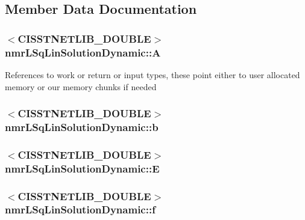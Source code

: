 \subsection{Member Data Documentation}
\hypertarget{classnmr_l_sq_lin_solution_dynamic_aa4a41abac141e2e55dd5cafb59169dfd}{
\subsubsection[{A}]{$<$C\-I\-S\-S\-T\-N\-E\-T\-L\-I\-B\-\_\-\-D\-O\-U\-B\-L\-E$>$ nmr\-L\-Sq\-Lin\-Solution\-Dynamic\-::\-A\hspace{0.3cm}{\ttfamily [protected]}}}\label{classnmr_l_sq_lin_solution_dynamic_aa4a41abac141e2e55dd5cafb59169dfd}
References to work or return or input types, these point either to user allocated memory or our memory chunks if needed \hypertarget{classnmr_l_sq_lin_solution_dynamic_a38efbfac59be113b58fd8a23cf543e5f}{
\subsubsection[{b}]{$<$C\-I\-S\-S\-T\-N\-E\-T\-L\-I\-B\-\_\-\-D\-O\-U\-B\-L\-E$>$ nmr\-L\-Sq\-Lin\-Solution\-Dynamic\-::b\hspace{0.3cm}{\ttfamily [protected]}}}\label{classnmr_l_sq_lin_solution_dynamic_a38efbfac59be113b58fd8a23cf543e5f}
\hypertarget{classnmr_l_sq_lin_solution_dynamic_a7c1ac112b07f3edd33d348fe0a40fb71}{
\subsubsection[{E}]{$<$C\-I\-S\-S\-T\-N\-E\-T\-L\-I\-B\-\_\-\-D\-O\-U\-B\-L\-E$>$ nmr\-L\-Sq\-Lin\-Solution\-Dynamic\-::\-E\hspace{0.3cm}{\ttfamily [protected]}}}\label{classnmr_l_sq_lin_solution_dynamic_a7c1ac112b07f3edd33d348fe0a40fb71}
\hypertarget{classnmr_l_sq_lin_solution_dynamic_a218e6ab273eb85a0bc7d44560c5d6b4f}{
\subsubsection[{f}]{$<$C\-I\-S\-S\-T\-N\-E\-T\-L\-I\-B\-\_\-\-D\-O\-U\-B\-L\-E$>$ nmr\-L\-Sq\-Lin\-Solution\-Dynamic\-::f\hspace{0.3cm}{\ttfamily [protected]}}}\label{classnmr_l_sq_lin_solution_dynamic_a218e6ab273eb85a0bc7d44560c5d6b4f}

